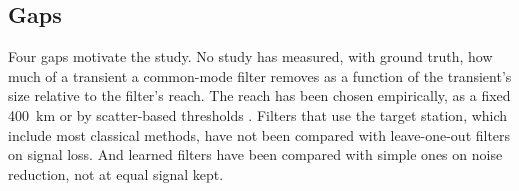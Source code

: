 \subsection{Gaps}

Four gaps motivate the study. No study has measured, with ground truth, how much of a transient a common-mode filter removes as a function of the transient's size relative to the filter's reach. The reach has been chosen empirically, as a fixed 400~km \citep{bachelot2025} or by scatter-based thresholds \citep{tianshen2016}. Filters that use the target station, which include most classical methods, have not been compared with leave-one-out filters on signal loss. And learned filters have been compared with simple ones on noise reduction, not at equal signal kept.

